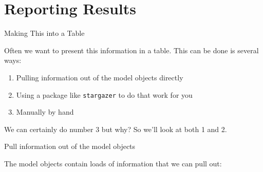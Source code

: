 \section{Reporting Results}\label{reporting-results}

\begin{frame}[fragile]{Making This into a Table}

\Large
Often we want to present this information in a table. This can be done
is several ways:

\begin{enumerate}
\def\labelenumi{\arabic{enumi}.}
\tightlist
\item
  Pulling information out of the model objects directly
\item
  Using a package like \texttt{stargazer} to do that work for you
\item
  Manually by hand
\end{enumerate}

We can certainly do number 3 but why? So we'll look at both 1 and 2.

\end{frame}

\begin{frame}{Pull information out of the model objects}

The model objects contain loads of information that we can pull out:


\end{frame}

